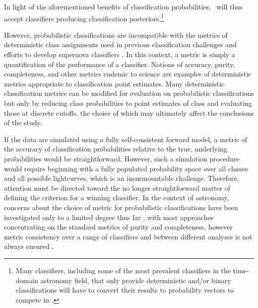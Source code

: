 In light of the aforementioned benefits of classification probabilities, \plasticc\ will thus accept classifiers producing classification posteriors.\footnote{Many classifiers, including some of the most prevalent classifiers in the time-domain astronomy field, that only provide deterministic and/or binary classifications will have to convert their results to probability vectors to compete in \plasticc.}

However, probabilistic classifications are incompatible with the metrics of deterministic class assignments used in previous classification challenges \citep{kessler_supernova_2010, kessler_results_2010} and efforts to develop supernova classifiers \citep{2018ApJS..236....9N}.
In this context, a metric is simply a quantification of the performance of a classifier.
Notions of accuracy, purity, completeness, and other metrics endemic to science are examples of deterministic metrics appropriate to classification point estimates.
Many deterministic classification metrics can be modified for evaluation on probabilistic classifications \citep{lochner_photometric_2016, moller_photometric_2016, hon_deep_2017, hon_detecting_2018, 2011arXiv1108.4696G} but only by reducing class probabilities to point estimates of class and evaluating those at discrete cutoffs, the choice of which may ultimately affect the conclusions of the study.

If the data are simulated using a fully self-consistent forward model, a metric of the accuracy of classification probabilities relative to the true, underlying probabilities would be straightforward.
However, such a simulation procedure would require beginning with a fully populated probability space over all classes and all possible lightcurves, which is an insurmountable challenge.
Therefore, attention must be directed toward the no longer straightforward matter of defining the criterion for a winning classifier.
In the context of astronomy, concerns about the choice of metric for probabilistic classifications have been investigated only to a limited degree thus far \citep{2018SoPh..293...28F, 2017MNRAS.464.4463K}
, with most approaches concentrating on the standard metrics of purity and completeness, however metric consistency over a range of classifiers and between different analyses is not always ensured \citep{2018A&C....23...15B}.

